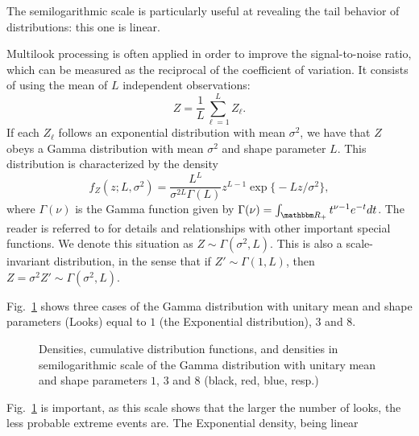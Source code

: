 The semilogarithmic scale is particularly useful at revealing the tail behavior of distributions: this one is linear.

Multilook processing is often applied in order to improve the signal-to-noise ratio, which can be measured as the reciprocal of the coefficient of variation.
It consists of using the mean of $L$ independent observations:
\begin{equation}
Z = \frac1L \sum_{\ell=1}^{L} Z_\ell.
\end{equation}
If each $Z_\ell$ follows an exponential distribution with mean $\sigma^2$, we have that $Z$ obeys a Gamma distribution with mean $\sigma^2$ and shape parameter $L$.
This distribution is characterized by the density
\begin{equation}
f_Z(z;L,\sigma^2) = \frac{L^L}{\sigma^{2L}\Gamma(L)} z^{L-1} 
	\exp\big\{ -L z / \sigma^2
	\big\},
\end{equation}
where $\Gamma(\nu)$ is the Gamma function given by $\Gamma(\nu)=\int_{\mathbbm R_+} t^{\nu-1} e^{-t} dt$.
The reader is referred to \citet{abramo-stegu64} for details and relationships with other important special functions.
We denote this situation as $Z\sim\Gamma(\sigma^2,L)$.
This is also a scale-invariant distribution, in the sense that if $Z'\sim\Gamma(1,L)$, then $Z=\sigma^2 Z'\sim \Gamma(\sigma^2,L)$.

Fig.~\ref{Fig:GammaDistribution} shows three cases of the Gamma distribution with unitary mean and shape parameters (Looks) equal to $1$ (the Exponential distribution), $3$ and $8$.

\begin{figure}[hbt]
\centering
{}
\caption[Densities, cumulative distribution functions, and densities in semilogarithmic scale of the Gamma distribution with unitary mean and shape parameters $1$, $3$ and $8$]{Densities, cumulative distribution functions, and densities in semilogarithmic scale of the Gamma distribution with unitary mean and shape parameters $1$, $3$ and $8$ (black, red, blue, resp.)}\label{Fig:GammaDistribution}
\end{figure}

Fig.~\ref{Fig:GammaDistribution} is important, as this scale shows that the larger the number of looks, the less probable extreme events are.
The Exponential density, being linear

